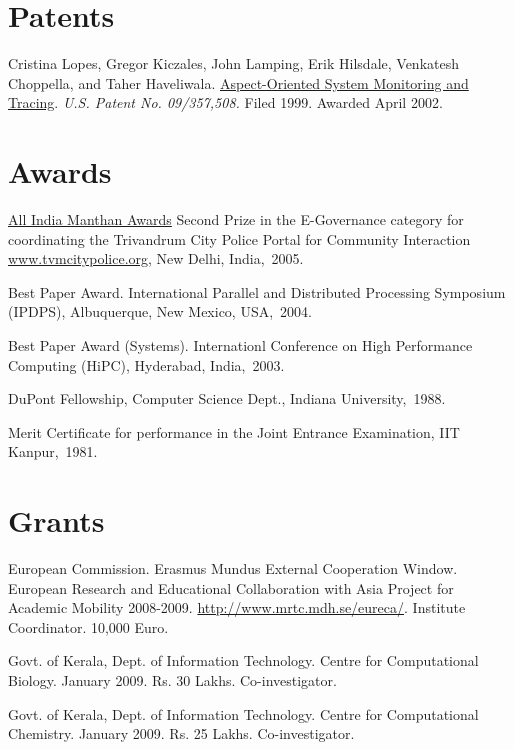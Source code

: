 \documentclass[11pt,margin,line]{res}
\begin{document}
\begin{resume}
\vspace{2em}

\section{\sc Patents}

Cristina Lopes, Gregor Kiczales, John Lamping, Erik Hilsdale,
Venkatesh Choppella, and Taher Haveliwala.
\href{http://www.patentstorm.us/patents/6473895.html}
{Aspect-Oriented System Monitoring and Tracing}.  {\em {U.S.
    Patent No. 09/357,508.}} Filed 1999. Awarded April 2002.

\section{\sc Awards}

\href{http://www.manthanaward.com/winner2005.asp}{All India
Manthan Awards} Second Prize in the E-Governance category
for coordinating the Trivandrum City Police Portal for
Community Interaction \url{www.tvmcitypolice.org}, New
Delhi, India,~2005.

Best Paper Award. International Parallel and Distributed
Processing Symposium (IPDPS), Albuquerque, New Mexico,
USA,~2004.


Best Paper Award  (Systems). Internationl Conference on High
Performance Computing (HiPC), Hyderabad, India,~2003.

DuPont Fellowship, Computer Science Dept., Indiana
University,~1988.

Merit Certificate for performance in the Joint Entrance
Examination, IIT Kanpur,~1981.


\section{\sc Grants}

European Commission.  Erasmus Mundus External Cooperation
Window. European Research and Educational Collaboration with
Asia Project for Academic Mobility 2008-2009.
\url{http://www.mrtc.mdh.se/eureca/}.  Institute
Coordinator.  10,000 Euro.

Govt. of Kerala, Dept. of Information Technology.  Centre
for Computational Biology.  January 2009.  Rs. 30 Lakhs.
Co-investigator.

Govt. of Kerala, Dept. of Information Technology.  Centre
for Computational Chemistry.  January 2009.  Rs. 25 Lakhs.
Co-investigator.


\end{resume}
\end{document}
